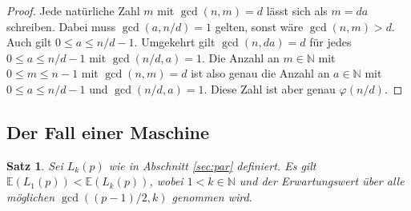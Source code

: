 \documentclass[a4paper, 10pt, ngerman]{article}
\newcommand{\E}{\mathbb{E}}
\newcommand{\N}{\mathbb{N}}
\newtheorem{theorem}{Satz}
\begin{document}
\begin{proof}
    Jede natürliche Zahl $m$ mit $\gcd(n, m) = d$ lässt sich als $m = da$ schreiben. Dabei muss $\gcd(a, n / d) = 1$ gelten, sonst wäre $\gcd(n, m) > d$. Auch gilt $0 \le a \le n/d - 1$. Umgekehrt gilt $\gcd(n, da) = d$ für jedes $0 \le a \le n/d - 1$ mit $\gcd(n/d, a) = 1$. Die Anzahl an $m \in \N$ mit $0 \le m \le n - 1$ mit $\gcd(n, m) = d$ ist also genau die Anzahl an $a \in \N$ mit $0 \le a \le  n / d - 1$ und $\gcd(n / d, a) = 1$. Diese Zahl ist aber genau $\varphi(n/d)$.
\end{proof}

\subsection{Der Fall einer Maschine}

\begin{theorem}
    Sei $L_k(p)$ wie in Abschnitt \ref{sec:par} definiert. Es gilt $\E(L_1(p)) < \E(L_k(p))$, wobei $1 < k \in \N$ und der Erwartungswert über alle möglichen $\gcd((p - 1)/2, k)$ genommen wird.
\end{theorem}
\end{document}
